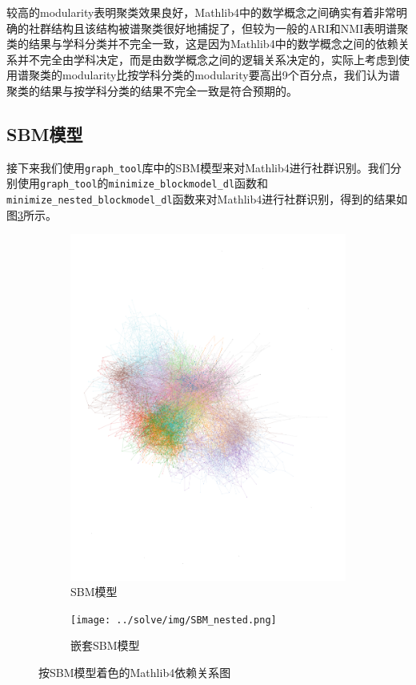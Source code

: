 较高的modularity表明聚类效果良好，Mathlib4中的数学概念之间确实有着非常明确的社群结构且该结构被谱聚类很好地捕捉了，但较为一般的ARI和NMI表明谱聚类的结果与学科分类并不完全一致，这是因为Mathlib4中的数学概念之间的依赖关系并不完全由学科决定，而是由数学概念之间的逻辑关系决定的，实际上考虑到使用谱聚类的modularity比按学科分类的modularity要高出9个百分点，我们认为谱聚类的结果与按学科分类的结果不完全一致是符合预期的。

\subsection{SBM模型}
接下来我们使用\texttt{graph\_tool}库中的SBM模型来对Mathlib4进行社群识别。我们分别使用\texttt{graph\_tool}的\texttt{minimize\_blockmodel\_dl}函数和\texttt{minimize\_nested\_blockmodel\_dl}函数来对Mathlib4进行社群识别，得到的结果如图\ref{fig:SBM_combined}所示。

\begin{figure}[htb]
  \centering
  \begin{subfigure}[b]{0.45\textwidth}
    \centering
    \includegraphics[width=\textwidth, trim=0cm 10cm 0cm 10cm, clip]{../solve/img/SBM.png}
    \caption{SBM模型}
    \label{fig:SBM}
  \end{subfigure}
  \hfill
  \begin{subfigure}[b]{0.45\textwidth}
    \centering
    \texttt{[image: ../solve/img/SBM\_nested.png]}
    \caption{嵌套SBM模型}
    \label{fig:nest_SBM}
  \end{subfigure}
  \caption{按SBM模型着色的Mathlib4依赖关系图}
  \label{fig:SBM_combined}
\end{figure}

